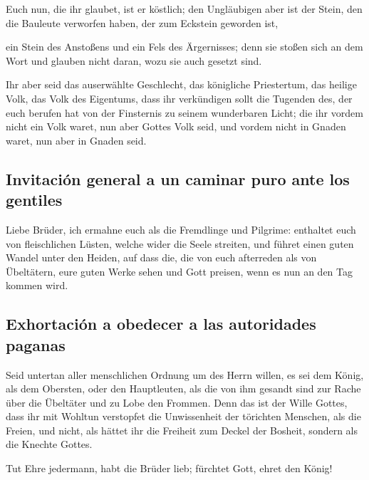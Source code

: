  Euch nun, die ihr glaubet, ist er köstlich; den
Ungläubigen aber ist der Stein, den die Bauleute verworfen haben, der
zum Eckstein geworden ist,

 ein Stein des Anstoßens und ein Fels des Ärgernisses;
denn sie stoßen sich an dem Wort und glauben nicht daran, wozu sie auch
gesetzt sind.

 Ihr aber seid das auserwählte Geschlecht, das königliche
Priestertum, das heilige Volk, das Volk des Eigentums, dass ihr
verkündigen sollt die Tugenden des, der euch berufen hat von der
Finsternis zu seinem wunderbaren Licht;  die ihr vordem
nicht ein Volk waret, nun aber Gottes Volk seid, und vordem nicht in
Gnaden waret, nun aber in Gnaden seid.

\hypertarget{invitaciuxf3n-general-a-un-caminar-puro-ante-los-gentiles}{%
\subsection{Invitación general a un caminar puro ante los
gentiles}\label{invitaciuxf3n-general-a-un-caminar-puro-ante-los-gentiles}}

 Liebe Brüder, ich ermahne euch als die Fremdlinge und
Pilgrime: enthaltet euch von fleischlichen Lüsten, welche wider die
Seele streiten,  und führet einen guten Wandel unter den
Heiden, auf dass die, die von euch afterreden als von Übeltätern, eure
guten Werke sehen und Gott preisen, wenn es nun an den Tag kommen wird.

\hypertarget{exhortaciuxf3n-a-obedecer-a-las-autoridades-paganas}{%
\subsection{Exhortación a obedecer a las autoridades
paganas}\label{exhortaciuxf3n-a-obedecer-a-las-autoridades-paganas}}

 Seid untertan aller menschlichen Ordnung um des Herrn
willen, es sei dem König, als dem Obersten,  oder den
Hauptleuten, als die von ihm gesandt sind zur Rache über die Übeltäter
und zu Lobe den Frommen.  Denn das ist der Wille Gottes,
dass ihr mit Wohltun verstopfet die Unwissenheit der törichten Menschen,
 als die Freien, und nicht, als hättet ihr die Freiheit
zum Deckel der Bosheit, sondern als die Knechte Gottes.

 Tut Ehre jedermann, habt die Brüder lieb; fürchtet Gott,
ehret den König!

